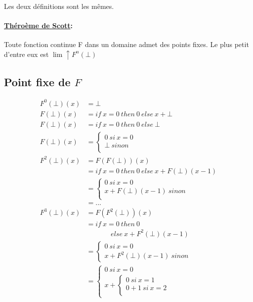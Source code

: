 \documentclass[11pt,a4paper]{article}
\begin{document}
	Les deux définitions sont les mêmes.
	
	\paragraph{\underline{Théroème de Scott}:}
	
	Toute fonction continue F dans un domaine admet des points fixes. Le plus petit d'entre eux est $\lim \uparrow F^n(\bot)$
	
	\subsection{Point fixe de $F$}
	
	\begin{align*}
		F^{0}(\bot)(x) &= \bot\\
		F(\bot)(x) &= if\ x = 0\ then\ 0\ else\ x + \bot\\
		F(\bot)(x) &= if\ x = 0\ then\ 0\ else\ \bot\\
		F(\bot)(x) &= 	\begin{cases}
							0\ si\ x = 0\\
							\bot\ sinon\\
						\end{cases}\\
		F^{2}(\bot)(x) &= F(F(\bot))(x)\\
		&= if\ x = 0\ then\ 0\ else\ x + F(\bot)(x - 1)\\
		&= 	\begin{cases}
				0\ si\ x = 0\\
				x + F(\bot)(x - 1)\ sinon\\
			\end{cases}\\
		&= ...\\
		F^3(\bot)(x) &= F(F^2(\bot))(x)\\
		&= if\ x = 0\ then\ 0\\
		&\ \ \ \ \ \ \ \ \ \ \ \ \ \ \ \ else\ x + F^2(\bot)(x - 1)\\
		&=	\begin{cases}
				0\ si\ x = 0\\
				x + F^2(\bot)(x - 1)\ sinon
			\end{cases}\\
		&=	\begin{cases}
				0\ si\ x = 0\\
				x + \begin{cases}
						0\ si\ x = 1\\
						0 + 1\ si\ x = 2\\

\end{cases}
\end{cases}
\end{align*}
\end{document}
